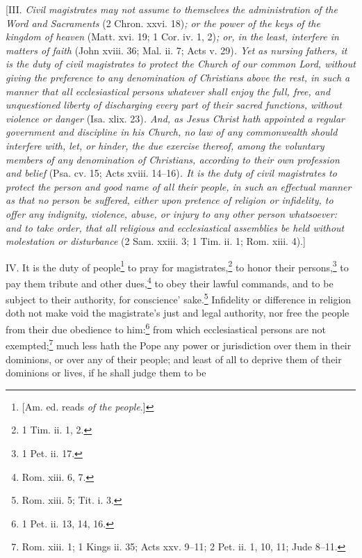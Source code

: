 [III. \emph{Civil magistrates may not assume to themselves the administration of the Word and Sacraments }(2 Chron. xxvi. 18)\emph{; or the power of the keys of the kingdom of heaven }(Matt. xvi. 19; 1 Cor. iv. 1, 2)\emph{; or, in the least, interfere in matters of faith }(John xviii. 36; Mal. ii. 7; Acts v. 29)\emph{. Yet as nursing fathers, it is the duty of civil magistrates to protect the Church of our common Lord, without giving the preference to any denomination of Christians above the rest, in such a manner that all ecclesiastical persons whatever } \emph{shall enjoy the full, free, and unquestioned liberty of discharging every part of their sacred functions, without violence or danger }(Isa. xlix. 23)\emph{. And, as Jesus Christ hath appointed a regular government and discipline in his Church, no law of any commonwealth should interfere with, let, or hinder, the due exercise thereof, among the voluntary members of any denomination of Christians, according to their own profession and belief }(Psa. cv. 15; Acts xviii. 14–16)\emph{. It is the duty of civil magistrates to protect the person and good name of all their people, in such an effectual manner as that no person be suffered, either upon pretence of religion or infidelity, to offer any indignity, violence, abuse, or injury to any other person whatsoever: and to take order, that all religious and ecclesiastical assemblies be held without molestation or disturbance }(2 Sam. xxiii. 3; 1 Tim. ii. 1; Rom. xiii. 4).]

IV. It is the duty of people\footnote{[Am. ed. reads \emph{of the people}.]} to pray for magistrates,\footnote{1 Tim. ii. 1, 2.} to honor their persons,\footnote{1 Pet. ii. 17.} to pay them tribute and other dues,\footnote{Rom. xiii. 6, 7.} to obey their lawful commands, and to be subject to their authority, for conscience' sake.\footnote{Rom. xiii. 5; Tit. i. 3.} Infidelity or difference in religion doth not make void the magistrate's just and legal authority, nor free the people from their due obedience to him:\footnote{1 Pet. ii. 13, 14, 16.} from which ecclesiastical persons are not exempted;\footnote{Rom. xiii. 1; 1 Kings ii. 35; Acts xxv. 9–11; 2 Pet. ii. 1, 10, 11; Jude 8–11.} much less hath the Pope any power or jurisdiction over them in their dominions, or over any of their people; and least of all to deprive them of their dominions or lives, if he shall judge them to be

